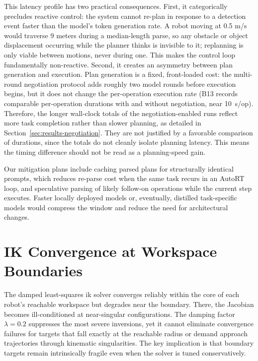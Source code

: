 \documentclass[
     12pt,
     a4paper,
     BCOR=10mm,
     DIV=14,
     listof=totoc,
     bibliography=totoc,
     parskip,
     twoside,
     headsepline
     ]{scrreprt}
\begin{document}
This latency profile has two practical consequences. First, it categorically precludes reactive control: the system cannot re-plan in response to a detection event faster than the model's token generation rate. A robot moving at 0.5 m/s would traverse 9 meters during a median-length parse, so any obstacle or object displacement occurring while the planner thinks is invisible to it; replanning is only viable between motions, never during one. This makes the control loop fundamentally non-reactive. Second, it creates an asymmetry between plan generation and execution. Plan generation is a fixed, front-loaded cost: the multi-round negotiation protocol adds roughly two model rounds before execution begins, but it does not change the per-operation execution rate (B13 records comparable per-operation durations with and without negotiation, near 10~s/op). Therefore, the longer wall-clock totals of the negotiation-enabled runs reflect more task completion rather than slower planning, as detailed in Section~\ref{sec:results-negotiation}. They are not justified by a favorable comparison of durations, since the totals do not cleanly isolate planning latency. This means the timing difference should not be read as a planning-speed gain.

Our mitigation plans include caching parsed plans for structurally identical prompts, which reduces re-parse cost when the same task recurs in an AutoRT loop, and speculative parsing of likely follow-on operations while the current step executes. Faster locally deployed models or, eventually, distilled task-specific models would compress the window and reduce the need for architectural changes.

\section{IK Convergence at Workspace Boundaries}
The damped least-squares \gls{ik} solver converges reliably within the core of each robot's reachable workspace but degrades near the boundary. There, the Jacobian becomes ill-conditioned at near-singular configurations. The damping factor $\lambda = 0.2$ suppresses the most severe inversions, yet it cannot eliminate convergence failures for targets that fall exactly at the reachable radius or demand approach trajectories through kinematic singularities. The key implication is that boundary targets remain intrinsically fragile even when the solver is tuned conservatively.
\end{document}
